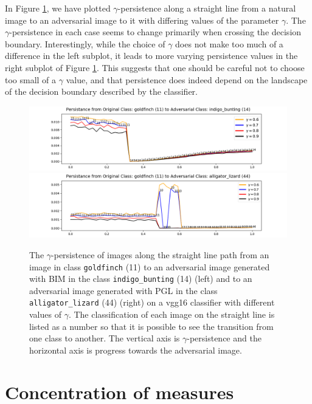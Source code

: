 In Figure \ref{fig:persistencediffgamma}, we have plotted $\gamma$-persistence along a straight line from a natural image to an adversarial image to it with differing values of the parameter $\gamma$. The $\gamma$-persistence in each case seems to change primarily when crossing the decision boundary. Interestingly, while the choice of $\gamma$ does not make too much of a difference in the left subplot, it leads to more varying persistence values in the right subplot of Figure \ref{fig:persistencediffgamma}.  This suggests that one should be careful not to choose too small of a $\gamma$ value, and that persistence does indeed depend on the landscape of the decision boundary described by the classifier.

\clearpage
\begin{figure}[!htb]
    \centering
    \includegraphics[width=.49\textwidth]{c2_figures/persistence_interpolation-multi-sigma-IMNET-class-11-vgg16-BIM-48-attack_data-001.png}
    \includegraphics[width=.49\textwidth]{c2_figures/persistence_interpolation-multi-sigma-IMNET-class-11-vgg16-PGDL2-1008-attack_data-003.png}
    \caption{The $\gamma$-persistence of images along the straight line path from an image in class \texttt{goldfinch} (11) to an adversarial image generated with BIM in the class \texttt{indigo\_bunting} (14)  (left) and to an adversarial image generated with PGL in the class \texttt{alligator\_lizard} (44) (right) on a vgg16 classifier with different values of $\gamma$. The classification of each image on the straight line is listed as a number so that it is possible to see the transition from one class to another. The vertical axis is $\gamma$-persistence and the horizontal axis is progress towards the adversarial image.}
    \label{fig:persistencediffgamma}
\end{figure}


\section{Concentration of measures} \label{sec:concentration}

